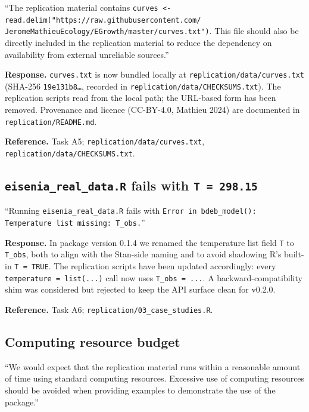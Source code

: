 \documentclass[11pt,a4paper]{article}
\newcommand{\code}[1]{\texttt{#1}}
\begin{document}
\begin{displayquote}
``The replication material contains
\verb|curves <- read.delim(|\allowbreak\verb|"https://raw.githubusercontent.com/|\allowbreak
\verb|JeromeMathieuEcology/|\allowbreak\verb|EGrowth/master/curves.txt")|.
This file should also be directly included in the replication material
to reduce the dependency on availability from external unreliable
sources.''
\end{displayquote}

\textbf{Response.} \code{curves.txt} is now bundled locally at
\code{replication/data/curves.txt} (SHA-256 \code{19e131b8\ldots},
recorded in \code{replication/data/CHECKSUMS.txt}). The replication
scripts read from the local path; the URL-based form has been
removed. Provenance and licence (CC-BY-4.0, Mathieu 2024) are
documented in \code{replication/README.md}.

\textbf{Reference.} Task A5; \code{replication/data/curves.txt},
\code{replication/data/CHECKSUMS.txt}.

\subsection{\code{eisenia\_real\_data.R} fails with \code{T~=~298.15}}

\begin{displayquote}
``Running \code{eisenia\_real\_data.R} fails with
\verb|Error in bdeb_model():|\allowbreak{} \verb|Temperature list missing: T_obs.|''
\end{displayquote}

\textbf{Response.} In package version 0.1.4 we renamed the
temperature list field \code{T} to \code{T\_obs}, both to align with
the Stan-side naming and to avoid shadowing R's built-in
\code{T~=~TRUE}. The replication scripts have been updated
accordingly: every \verb|temperature = list(...)| call now uses
\verb|T_obs = ...|. A backward-compatibility shim was considered but
rejected to keep the API surface clean for v0.2.0.

\textbf{Reference.} Task A6; \code{replication/03\_case\_studies.R}.

\subsection{Computing resource budget}

\begin{displayquote}
``We would expect that the replication material runs within a
reasonable amount of time using standard computing resources.
Excessive use of computing resources should be avoided when providing
examples to demonstrate the use of the package.''
\end{displayquote}
\end{document}
